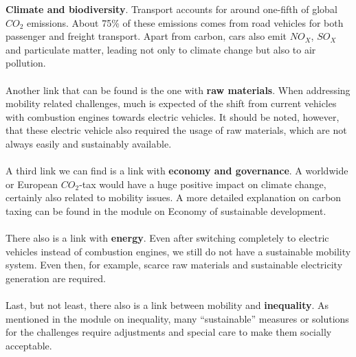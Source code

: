 \documentclass[../summary.tex]{subfiles}
\begin{document}
	\textbf{Climate and biodiversity}. Transport accounts for around one-fifth of global $CO_2$ emissions. About 75\% of these emissions comes from road vehicles for both passenger and freight transport. Apart from carbon, cars also emit $NO_X$, $SO_X$ and particulate matter, leading not only to climate change but also to air pollution. 
	\\\\
	Another link that can be found is the one with \textbf{raw materials}. When addressing mobility related challenges, much is expected of the shift from current vehicles with combustion engines towards electric vehicles. It should be noted, however, that these electric vehicle also required the usage of raw materials, which are not always easily and sustainably available. 
	\\\\
	A third link we can find is a link with \textbf{economy and governance}. A worldwide or European $CO_2$-tax would have a huge positive impact on climate change, certainly also related to mobility issues. A more detailed explanation on carbon taxing can be found in the module on Economy of sustainable development. 
	\\\\
	There also is a link with \textbf{energy}. Even after switching completely to electric vehicles instead of combustion engines, we still do not have a sustainable mobility system. Even then, for example, scarce raw materials and sustainable electricity generation are required.
	\\\\
	Last, but not least, there also is a link between mobility and \textbf{inequality}. As mentioned in the module on inequality, many “sustainable” measures or solutions for the challenges require adjustments and special care to make them socially acceptable.
	
\end{document}
